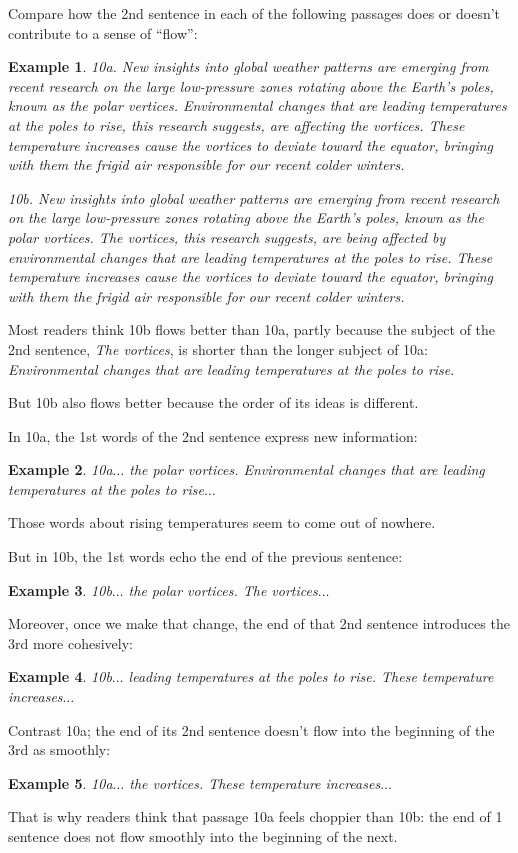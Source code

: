 \documentclass[oneside]{book}
\numberwithin{equation}{section}
\newtheorem{example}{Example}[section]
\begin{document}
Compare how the 2nd sentence in each of the following passages does or doesn't contribute to a sense of ``flow'':
\begin{example}
    10a. New insights into global weather patterns are emerging from recent research on the large low-pressure zones rotating above the Earth's poles, known as the polar vertices. Environmental changes that are leading temperatures at the poles to rise, this research suggests, are affecting the vortices. These temperature increases cause the vortices to deviate toward the equator, bringing with them the frigid air responsible for our recent colder winters.
    
    10b. New insights into global weather patterns are emerging from recent research on the large low-pressure zones rotating above the Earth's poles, known as the polar vortices. The vortices, this research suggests, are being affected by environmental changes that are leading temperatures at the poles to rise. These temperature increases cause the vortices to deviate toward the equator, bringing with them the frigid air responsible for our recent colder winters.
\end{example}
Most readers think 10b flows better than 10a, partly because the subject of the 2nd sentence, \textit{The vortices}, is shorter than the longer subject of 10a: \textit{Environmental changes that are leading temperatures at the poles to rise}.

But 10b also flows better because the order of its ideas is different.

%
In 10a, the 1st words of the 2nd sentence express new information:
\begin{example}
    10a$\ldots$ the polar vortices. Environmental changes that are leading temperatures at the poles to rise$\ldots$
\end{example}
Those words about rising temperatures seem to come out of nowhere.

But in 10b, the 1st words echo the end of the previous sentence:
\begin{example}
    10b$\ldots$ the polar vortices. The vortices$\ldots$
\end{example}
Moreover, once we make that change, the end of that 2nd sentence introduces the 3rd more cohesively:
\begin{example}
    10b$\ldots$ leading temperatures at the poles to rise. These temperature increases$\ldots$
\end{example}
Contrast 10a; the end of its 2nd sentence doesn't flow into the beginning of the 3rd as smoothly:
\begin{example}
    10a$\ldots$ the vortices. These temperature increases$\ldots$
\end{example}
That is why readers think that passage 10a feels choppier than 10b: the end of 1 sentence does not flow smoothly into the beginning of the next.
\end{document}
